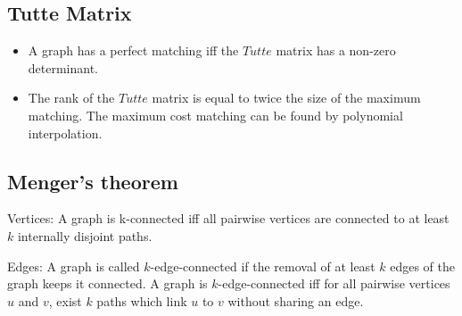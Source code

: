 \subsection{Tutte Matrix}
	\begin{itemize}
	\item A graph has a perfect matching iff the $Tutte$ matrix has a non-zero determinant.

	\item The rank of the $Tutte$ matrix is equal to twice the size of the maximum matching. The maximum cost matching can be found by polynomial interpolation.
	\end{itemize}

\subsection{Menger's theorem}
\item Vertices:
A graph is k-connected iff all pairwise vertices are connected to at least 
$k$ internally disjoint paths.
\item Edges:
A graph is called $k$-edge-connected if the removal of at least $k$ edges of the graph keeps it connected. A graph is $k$-edge-connected iff for all pairwise vertices $u$ and $v$, exist $k$ paths which link $u$ to $v$ without sharing an edge.



